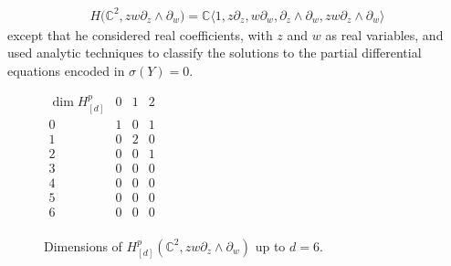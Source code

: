\documentclass[pdftex]{sigma}
\numberwithin{equation}{section}
\begin{document}
\begin{gather*}
H\big({\mathbb C}^2,zw\partial_z\wedge\partial_w\big)={\mathbb C}\langle 1,z\partial_z,w\partial_w,\partial_z\wedge\partial_w,zw\partial_z\wedge\partial_w\rangle
\end{gather*}
except that he considered real coef\/f\/icients, with $z$ and $w$ as real variables, and used analytic techniques to classify the solutions to the partial dif\/ferential equations encoded in $\sigma(Y)=0$.

\begin{figure}[t]\centering
$
\begin{array}{c|ccc}
\dim H_{[d]}^p & 0 & 1 & 2 \\ \hline
0 & 1 & 0 & 1 \\
1 & 0 & 2 & 0 \\
2 & 0 & 0 & 1 \\
3 & 0 & 0 & 0 \\
4 & 0 & 0 & 0 \\
5 & 0 & 0 & 0 \\
6 & 0 & 0 & 0 \\
\end{array}
$
\caption{\label{Nakanishi_vanishing_table}Dimensions of $H^p_{[d]}({\mathbb C}^2,zw\partial_z\wedge\partial_w)$ up to $d=6$.}
\end{figure}
\end{document}
